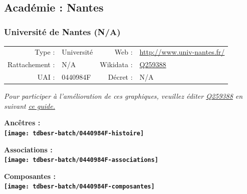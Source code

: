 \documentclass[12pt,french,]{article}
\begin{document}
\ifoddpage \fi ~\newpage  

\hypertarget{acaduxe9mie-nantes}{%
\subsection{Académie : Nantes}\label{acaduxe9mie-nantes}}

\hypertarget{universituxe9-de-nantes-na}{%
\subsubsection{Université de Nantes
(N/A)}\label{universituxe9-de-nantes-na}}

\begin{tabular*}{\textwidth}{rp{5cm}rl}  
\hline  
Type : & Université & Web : &\href{http://www.univ-nantes.fr/}{http://www.univ-nantes.fr/} \\  
Rattachement : & N/A & Wikidata : & \href{https://www.wikidata.org/entity/Q259388}{Q259388} \\  
UAI : & 0440984F & Décret : & N/A \\  
\hline  
\end{tabular*}

\textit{\scriptsize Pour participer à l'amélioration de ces graphiques, veuillez éditer  \href{https://www.wikidata.org/entity/Q259388}{Q259388}  en suivant \href{https://github.com/cpesr/wikidataESR/blob/master/Rmd/wikidataESR.md}{ce guide.}}

\vspace{1cm}  
\begin{minipage}[b]{0.50\textwidth}\begin{center} \bf Ancêtres : \\  
\texttt{[image: tdbesr-batch/0440984F-histoire]} \end{center}\end{minipage}\begin{minipage}[b]{0.50\textwidth}\begin{center} \bf Associations : \\  
\texttt{[image: tdbesr-batch/0440984F-associations]} \end{center}\end{minipage}

\hrulefill

\begin{center} \bf Composantes : \\  
\texttt{[image: tdbesr-batch/0440984F-composantes]} \end{center}
\end{document}
